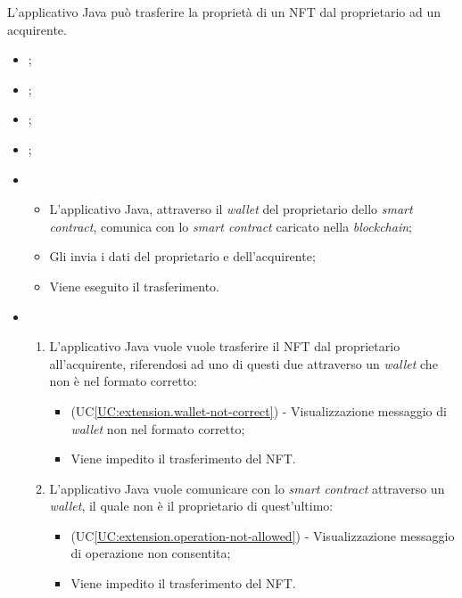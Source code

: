 \label{UC:transfer-nft}

L'applicativo Java può trasferire la proprietà di un NFT dal proprietario ad un acquirente.

\begin{itemize}
  \item {};
  \item {};
  \item {};
  \item {};
  
  \item \UCMain
  \begin{itemize}
    \item L'applicativo Java, attraverso il \textit{wallet} del proprietario dello \textit{smart contract}, comunica con lo \textit{smart contract} caricato nella \textit{blockchain};
    \item Gli invia i dati del proprietario e dell'acquirente;
    \item Viene eseguito il trasferimento.
  \end{itemize}

  \item \UCExt
  \begin{enumerate}[label=\lett]
    \item L'applicativo Java vuole vuole trasferire il NFT dal proprietario all'acquirente, riferendosi ad uno di questi due attraverso un \textit{wallet} che non è nel formato corretto:
    \begin{itemize}
      \item (UC\ref{UC:extension.wallet-not-correct}) - Visualizzazione messaggio di \textit{wallet} non nel formato corretto;
      \item Viene impedito il trasferimento del NFT.
    \end{itemize}

    \item L'applicativo Java vuole comunicare con lo \textit{smart contract} attraverso un \textit{wallet}, il quale non è il proprietario di quest'ultimo:
    \begin{itemize}
      \item (UC\ref{UC:extension.operation-not-allowed}) - Visualizzazione messaggio di operazione non consentita;
      \item Viene impedito il trasferimento del NFT.
    \end{itemize}


\end{enumerate}
\end{itemize}
